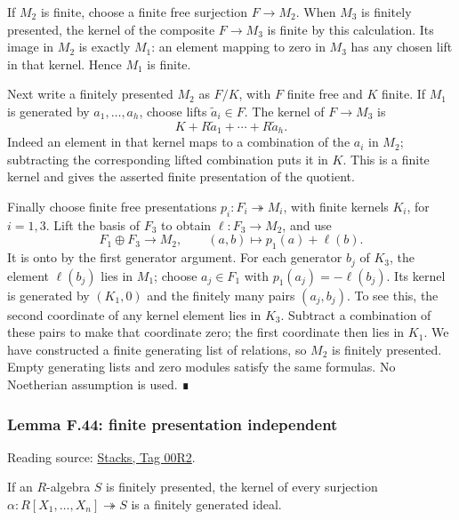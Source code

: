 \documentclass[11pt,a4paper,openany]{report}
\begin{document}
If \(M_2\) is finite, choose a finite free surjection \(F\to M_2\). When \(M_3\) is finitely presented, the kernel of the composite \(F\to M_3\) is finite by this calculation. Its image in \(M_2\) is exactly \(M_1\): an element mapping to zero in \(M_3\) has any chosen lift in that kernel. Hence \(M_1\) is finite.

Next write a finitely presented \(M_2\) as \(F/K\), with \(F\) finite free and \(K\) finite. If \(M_1\) is generated by \(a_1,\ldots,a_h\), choose lifts \(\widetilde a_i\in F\). The kernel of \(F\to M_3\) is \[
K+R\widetilde a_1+\cdots+R\widetilde a_h.
\] Indeed an element in that kernel maps to a combination of the \(a_i\) in \(M_2\); subtracting the corresponding lifted combination puts it in \(K\). This is a finite kernel and gives the asserted finite presentation of the quotient.

Finally choose finite free presentations \(p_i : F_i\twoheadrightarrow M_i\), with finite kernels \(K_i\), for \(i=1,3\). Lift the basis of \(F_3\) to obtain \(\ell : F_3\to M_2\), and use \[
F_1\oplus F_3\longrightarrow M_2,
\qquad (a,b)\longmapsto p_1(a)+\ell(b).
\] It is onto by the first generator argument. For each generator \(b_j\) of \(K_3\), the element \(\ell(b_j)\) lies in \(M_1\); choose \(a_j\in F_1\) with \(p_1(a_j)=-\ell(b_j)\). Its kernel is generated by \((K_1,0)\) and the finitely many pairs \((a_j,b_j)\). To see this, the second coordinate of any kernel element lies in \(K_3\). Subtract a combination of these pairs to make that coordinate zero; the first coordinate then lies in \(K_1\). We have constructed a finite generating list of relations, so \(M_2\) is finitely presented. Empty generating lists and zero modules satisfy the same formulas. No Noetherian assumption is used. ∎

\label{AG-RG-S05-algebra-lemma-finite-presentation-independent}

\subsubsection{Lemma F.44: finite presentation independent}\label{AG-RG-S05-lemma-f.44-finite-presentation-independent}

Reading source: \href{https://stacks.math.columbia.edu/tag/00R2}{Stacks, Tag 00R2}.

If an \(R\)-algebra \(S\) is finitely presented, the kernel of every surjection \(\alpha : R[X_1,\ldots,X_n]\twoheadrightarrow S\) is a finitely generated ideal.
\end{document}
